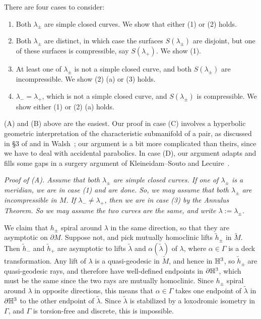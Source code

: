 \documentclass[12pt]{amsart}
\theoremstyle{definition}
\theoremstyle{remark}
\begin{document}
 There are four cases to consider:

\begin{enumerate}
	\item[(A)] Both $\lambda_\pm$ are simple closed curves. We show that either (1) or (2) holds.
	\item[(B)] Both $\lambda_\pm$ are distinct, in which case the surfaces $S(\lambda_\pm)$ are disjoint, but one of these surfaces is compressible, say $ S (\lambda_+) $. We show (1).
	\item[(C)] At least one of $\lambda_\pm$ is not a simple closed curve, and both $S(\lambda_\pm)$ are incompressible. We show (2) (a)  or (3) holds.
	\item[(D)] $\lambda_- = \lambda_+$, which is not a simple closed curve, and $S(\lambda_\pm)$ is compressible. We show either (1) or (2) (a) holds.
\end{enumerate}
(A) and (B) above are the easiest. Our proof in case (C) involves a hyperbolic geometric interpretation of the characteristic submanifold of a pair,  as discussed in \S 3 of 
\cite{lecuire2004structures} and in Walsh~\cite{Walshbumping}; our argument is a bit more complicated than theirs, since we have to deal with accidental parabolics.  In case (D), our argument adapts and fills some gaps in a surgery argument of Kleineidam--Souto \cite{Kleineidamalgebraic} and Lecuire~\cite[Appendix C]{Lecuireplissage}. 

\medskip

\noindent \it Proof of (A). \rm  Assume that both $\lambda_\pm$ are simple closed curves.  If one of $\lambda_\pm$ is a meridian, we are in case (1) and are done. So, we may assume that both $\lambda_\pm$ are incompressible in $M$. If $\lambda_-\neq \lambda_+$, then we are in case (3) by the Annulus Theorem. So we may assume the two curves are the same, and write $\lambda:=\lambda_\pm$. 

We claim that $h_\pm$ spiral around $\lambda$ in the same direction, so that they are asymptotic on $\partial M$. Suppose not, and pick mutually homoclinic lifts $\tilde h_\pm$ in $\tilde M$. Then $\tilde h_-$ and $\tilde h_+$ are asymptotic to lifts $\tilde \lambda$ and $ \alpha(\tilde \lambda)$ of $\lambda$, where $\alpha \in \Gamma $ is a deck transformation. Any lift of $\lambda$ is a quasi-geodesic in $\tilde M$, and hence in $\mathbb H^3$, so $\tilde h_\pm$ are quasi-geodesic rays, and therefore have well-defined endpoints in $\partial \mathbb H^3$, which must be the same since the two rays are mutually homoclinic. Since $h_\pm$ spiral around $\lambda$ in opposite directions, this means that $\alpha \in \Gamma$ takes one endpoint of $\tilde \lambda$ in $\partial \mathbb H^3$ to the other endpoint of $\tilde \lambda$. Since $\tilde \lambda$ is stabilized by a loxodromic isometry in $\Gamma$, and $\Gamma$ is torsion-free and discrete, this is impossible.
\end{document}
